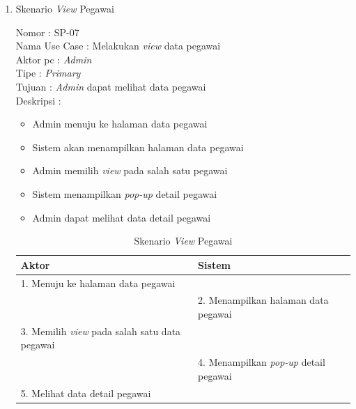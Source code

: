 \begin{enumerate}
\begin{table}
\begin{tabular}{ | l | p{61mm} |}
		\hline
		
	\end{tabular}
\end{table}

\item Skenario \textit{View} Pegawai

Nomor \kern 3.6pc : SP-07 \\
Nama Use Case : Melakukan \textit{view} data pegawai \\
Aktor  pc : \textit{Admin} \\
Tipe \kern 4.6pc : \textit{Primary} \\
Tujuan \kern 3.6pc : \textit{Admin} dapat melihat data pegawai \\
Deskripsi \kern 2.5pc : 

\begin{itemize}
	\item Admin menuju ke halaman data pegawai
	\item Sistem akan menampilkan halaman data pegawai
	\item Admin memilih \textit{view} pada salah satu pegawai
	\item Sistem menampilkan \textit{pop-up} detail pegawai
	\item Admin dapat melihat data detail pegawai
	
\end{itemize}

\begin{table}
	\caption{Skenario \textit{View} Pegawai}
	\centering
	\begin{tabular}{ | p{60mm} | p{68mm} |}
		\hline 
		\textbf{Aktor} & \textbf{Sistem} \\
		\hline
		
		1.	Menuju ke halaman data pegawai &  \\
		
		\hline
		
		&  2.	Menampilkan halaman data pegawai \\
		
		\hline
		
		3. Memilih \textit{view} pada salah satu data pegawai & \\
		
		\hline
		
		& 4.	Menampilkan \textit{pop-up} detail pegawai \\
		
		\hline
		
		5.	Melihat data detail pegawai  & \\
		\hline
		

\end{tabular}
\end{table}
\end{enumerate}
